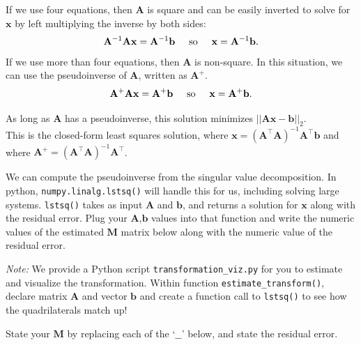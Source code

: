 \documentclass{csci1430}
\begin{document}
\clearpage
\begin{subquestion}[points=3,drawbox=false]
If we use four equations, then $\mathbf{A}$ is square and can be easily inverted to solve for $\mathbf{x}$ by left multiplying the inverse by both sides:
%
\begin{equation}
\mathbf{A}^{-1} \mathbf{A}\mathbf{x} = \mathbf{A}^{-1} \mathbf{b} \hspace{0.5cm}\text{so}\hspace{0.5cm} \mathbf{x} = \mathbf{A}^{-1} \mathbf{b}.
\end{equation}
%
If we use more than four equations, then $\mathbf{A}$ is non-square. In this situation, we can use the pseudoinverse of $\mathbf{A}$, written as $\mathbf{A}^+$.
\begin{equation}
\mathbf{A}^+ \mathbf{A}\mathbf{x} = \mathbf{A}^+ \mathbf{b}
\hspace{0.5cm}\text{so}\hspace{0.5cm} \mathbf{x} = \mathbf{A}^+ \mathbf{b}.
\end{equation}
    
As long as $\mathbf{A}$ has a pseudoinverse, this solution minimizes $||\mathbf{A}\mathbf{x} - \mathbf{b}||_2$.\\ 
This is the closed-form least squares solution, where $\mathbf{x} = (\mathbf{A}^\top \mathbf{A})^{-1}\mathbf{A}^\top\mathbf{b}$ and where $\mathbf{A}^+ = (\mathbf{A}^\top \mathbf{A})^{-1}\mathbf{A}^\top$.
    
We can compute the pseudoinverse from the singular value decomposition. In python, \texttt{numpy.linalg.lstsq()} will handle this for us, including solving large systems. \texttt{lstsq()} takes as input $\mathbf{A}$ and $\mathbf{b}$, and returns a solution for $\mathbf{x}$ along with the residual error. Plug your $\mathbf{A}$,$\mathbf{b}$ values into that function and write the numeric values of the estimated $\mathbf{M}$ matrix below along with the numeric value of the residual error.
    
\textit{Note:} We provide a Python script \texttt{transformation\_viz.py} for you to estimate and visualize the transformation. Within function \texttt{estimate\_transform()}, declare matrix $\mathbf{A}$ and vector $\mathbf{b}$ and create a function call to \texttt{lstsq()} to see how the quadrilaterals match up!
\end{subquestion}

\begin{orangebox}
State your $\mathbf{M}$ by replacing each of the `$\_\_$' below, and state the residual error.
\end{orangebox}
\end{document}
